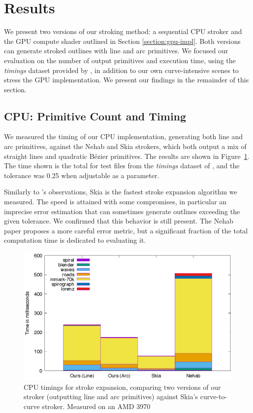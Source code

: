 \documentclass[sigconf, authordraft]{acmart}
\begin{document}

\section{Results}


We present two versions of our stroking method: a sequential CPU stroker and the GPU compute shader outlined in Section \ref{section:gpu-impl}. Both versions can generate stroked outlines with line and arc primitives. We focused our evaluation on the number of output primitives and execution time, using the \emph{timings} dataset provided by \citet{Nehab2020}, in addition to our own curve-intensive scenes to stress the GPU implementation. We present our findings in the remainder of this section.

\subsection{CPU: Primitive Count and Timing}

We measured the timing of our CPU implementation, generating both line and arc primitives, against the Nehab and Skia strokers, which both output a mix of straight lines and quadratic Bézier primitives. The results are shown in Figure~\ref{fig:timings}. The time shown is the total for test files from the \emph{timings} dataset of \citet{Nehab2020}, and the tolerance was 0.25 when adjustable as a parameter.

Similarly to \citet{Nehab2020}'s observations, Skia is the fastest stroke expansion algorithm we measured. The speed is attained with some compromises, in particular an imprecise error estimation that can sometimes generate outlines exceeding the given tolerance. We confirmed that this behavior is still present. The Nehab paper proposes a more careful error metric, but a significant fraction of the total computation time is dedicated to evaluating it.

\begin{figure}
    \includegraphics[scale=0.6]{timings}
    \caption{CPU timings for stroke expansion, comparing two versions of our stroker (outputting line and arc primitives) against Skia's curve-to-curve stroker. Measured on an AMD 3970}
    \label{fig:timings}
\end{figure}
\end{document}
